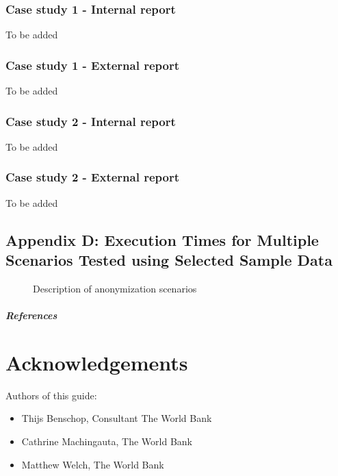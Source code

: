 \documentclass[letterpaper,10pt,english]{sphinxmanual}
\begin{document}
\subsection{Case study 1 - Internal report}
\label{\detokenize{appendices:case-study-1-internal-report}}
To be added


\subsection{Case study 1 - External report}
\label{\detokenize{appendices:case-study-1-external-report}}
To be added


\subsection{Case study 2 - Internal report}
\label{\detokenize{appendices:case-study-2-internal-report}}
To be added


\subsection{Case study 2 - External report}
\label{\detokenize{appendices:case-study-2-external-report}}
To be added


\section{Appendix D: Execution Times for Multiple Scenarios Tested using Selected Sample Data}
\label{\detokenize{appendices:appendix-d-execution-times-for-multiple-scenarios-tested-using-selected-sample-data}}
\begin{figure}[htbp]
\centering

\noindent{}
\end{figure}

\begin{figure}[htbp]
\centering
\capstart

\noindent{}
\caption{Description of anonymization scenarios}\label{\detokenize{appendices:id1}}\end{figure}
\paragraph{References}


\chapter{Acknowledgements}
\label{\detokenize{acknowledgements:acknowledgements}}\label{\detokenize{acknowledgements::doc}}
Authors of this guide:
\begin{itemize}
\item {} 
Thijs Benschop, Consultant The World Bank

\item {} 
Cathrine Machingauta, The World Bank

\item {} 
Matthew Welch, The World Bank

\end{itemize}
\end{document}
